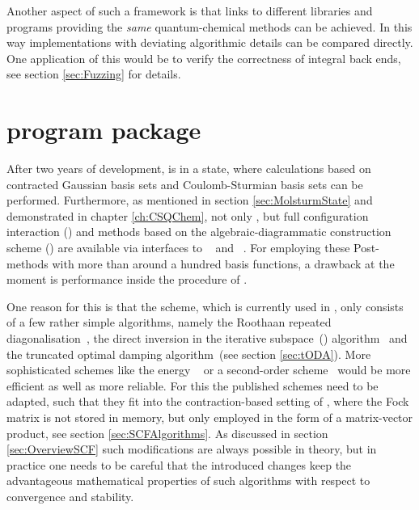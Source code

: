 Another aspect of such a framework is
that links to different libraries and programs
providing the \emph{same} quantum-chemical methods can be achieved.
In this way implementations with deviating algorithmic details
can be compared directly.
One application of this would be to verify the correctness
of integral back ends, see section \ref{sec:Fuzzing} for details.

%
%
\section{\molsturm program package}
\label{sec:newMolsturm}
After two years of development,
\molsturm is in a state,
where calculations based on contracted Gaussian basis sets
and Coulomb-Sturmian basis sets can be performed.
Furthermore, as mentioned in section \ref{sec:MolsturmState}
and demonstrated in chapter \ref{ch:CSQChem},
not only \HF, but full configuration interaction (\FCI) and
methods based on the algebraic-diagrammatic construction scheme (\ADC)
are available via interfaces to \pyscf~\cite{Sun2017} and \adcman~\cite{Wormit2014}.
For employing these Post-\HF methods
with more than around a hundred basis functions,
a drawback at the moment is performance
inside the \SCF procedure of \molsturm.

One reason for this is that the \SCF scheme,
which is currently used in \molsturm,
only consists of a few rather simple algorithms,
namely the Roothaan repeated diagonalisation~\cite{Roothaan1951},
the direct inversion in the iterative subspace~(\DIIS) algorithm~\cite{Pulay1982}
and the truncated optimal damping algorithm~(see section \ref{sec:tODA}).
More sophisticated schemes
like the energy \DIIS~\cite{Kudin2002}
or a second-order \SCF scheme~\cite{Salek2007,Hoest2008}
would be more efficient as well as more reliable.
For this the published schemes need to be adapted,
such that they fit into the contraction-based setting of \molsturm,
where the Fock matrix is not stored in memory,
but only employed in the form of a matrix-vector product,
see section \ref{sec:SCFAlgorithms}.
As discussed in section \ref{sec:OverviewSCF}
such modifications are always possible in theory,
but in practice one needs to be careful
that the introduced changes
keep the advantageous mathematical properties of such algorithms
with respect to convergence and stability.

